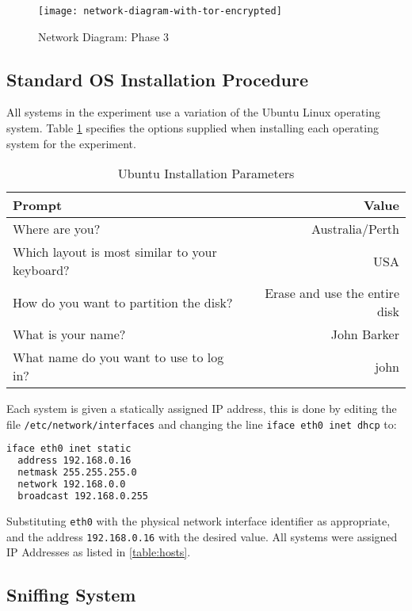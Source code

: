 \begin{figure}[H]
  \centering\texttt{[image: network-diagram-with-tor-encrypted]}
  \caption{Network Diagram: Phase 3}
  \label{fig:network-diagram-with-tor-encrypted}
\end{figure}

\subsection{Standard OS Installation Procedure}
\label{section:os_install}

All systems in the experiment use a variation of the Ubuntu Linux operating
system. Table \ref{table:config-options} specifies the options supplied when
installing each operating system for the experiment.

\begin{table}[H]
  \begin{tabular}{lr}
    \toprule
    Prompt & Value\\
    \midrule
    Where are you? & Australia/Perth\\
    Which layout is most similar to your keyboard? & USA\\
    How do you want to partition the disk? & Erase and use the entire disk\\
    What is your name? & John Barker\\
    What name do you want to use to log in? & john\\
    \bottomrule
  \end{tabular}
  \caption{Ubuntu Installation Parameters}
  \label{table:config-options}
\end{table}

Each system is given a statically assigned IP address, this is done by editing
the file \verb+/etc/network/interfaces+ and changing the line
\verb+iface eth0 inet dhcp+ to:

\begin{lstlisting}[language=sh]
iface eth0 inet static
  address 192.168.0.16
  netmask 255.255.255.0
  network 192.168.0.0
  broadcast 192.168.0.255
\end{lstlisting}

Substituting \verb+eth0+ with the physical network interface identifier as
appropriate, and the address \verb+192.168.0.16+ with the desired value. All
systems were assigned IP Addresses as listed in \ref{table:hosts}.

\subsection{Sniffing System}

